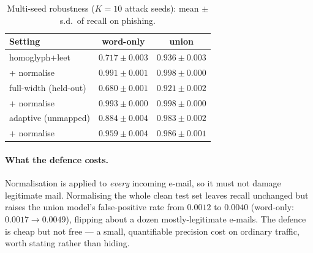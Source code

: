 \documentclass[11pt]{article}
\begin{document}
\begin{table}[t]
\centering
\caption{Multi-seed robustness ($K=10$ attack seeds): mean $\pm$ s.d.\ of recall on
phishing.}
\label{tab:ci}
\begin{tabular}{lcc}
\toprule
Setting & word-only & union \\
\midrule
homoglyph+leet             & $0.717\pm0.003$ & $0.936\pm0.003$ \\
\quad + normalise          & $0.991\pm0.001$ & $0.998\pm0.000$ \\
full-width (held-out)      & $0.680\pm0.001$ & $0.921\pm0.002$ \\
\quad + normalise          & $0.993\pm0.000$ & $0.998\pm0.000$ \\
adaptive (unmapped)        & $0.884\pm0.004$ & $0.983\pm0.002$ \\
\quad + normalise          & $0.959\pm0.004$ & $0.986\pm0.001$ \\
\bottomrule
\end{tabular}
\end{table}

\paragraph{What the defence costs.} Normalisation is applied to \emph{every} incoming
e-mail, so it must not damage legitimate mail. Normalising the whole clean test set leaves
recall unchanged but raises the union model's false-positive rate from $0.0012$ to $0.0040$
(word-only: $0.0017\rightarrow0.0049$), flipping about a dozen mostly-legitimate e-mails.
The defence is cheap but not free --- a small, quantifiable precision cost on ordinary
traffic, worth stating rather than hiding.
\end{document}
